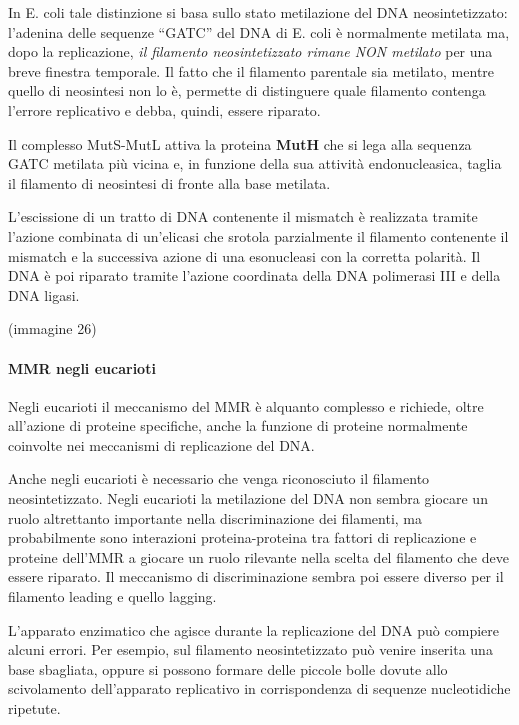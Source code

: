 \documentclass[11pt]{book}
\begin{document}
In E. coli tale distinzione si basa sullo stato metilazione del DNA
neosintetizzato: l'adenina delle sequenze ``GATC'' del DNA di E. coli è
normalmente metilata ma, dopo la replicazione, \emph{il filamento
neosintetizzato rimane NON metilato} per una breve finestra temporale.
Il fatto che il filamento parentale sia metilato, mentre quello di
neosintesi non lo è, permette di distinguere quale filamento contenga
l'errore replicativo e debba, quindi, essere riparato.

Il complesso MutS-MutL attiva la proteina \textbf{MutH} che si lega alla
sequenza GATC metilata più vicina e, in funzione della sua attività
endonucleasica, taglia il filamento di neosintesi di fronte alla base
metilata.

L'escissione di un tratto di DNA contenente il mismatch è realizzata
tramite l'azione combinata di un'elicasi che srotola parzialmente il
filamento contenente il mismatch e la successiva azione di una
esonucleasi con la corretta polarità. Il DNA è poi riparato tramite
l'azione coordinata della DNA polimerasi III e della DNA ligasi.

(immagine 26)

\paragraph{MMR negli eucarioti}\label{mmr-negli-eucarioti}

Negli eucarioti il meccanismo del MMR è alquanto complesso e richiede,
oltre all'azione di proteine specifiche, anche la funzione di proteine
normalmente coinvolte nei meccanismi di replicazione del DNA.

Anche negli eucarioti è necessario che venga riconosciuto il filamento
neosintetizzato. Negli eucarioti la metilazione del DNA non sembra
giocare un ruolo altrettanto importante nella discriminazione dei
filamenti, ma probabilmente sono interazioni proteina-proteina tra
fattori di replicazione e proteine dell'MMR a giocare un ruolo rilevante
nella scelta del filamento che deve essere riparato. Il meccanismo di
discriminazione sembra poi essere diverso per il filamento leading e
quello lagging.

L'apparato enzimatico che agisce durante la replicazione del DNA può
compiere alcuni errori. Per esempio, sul filamento neosintetizzato può
venire inserita una base sbagliata, oppure si possono formare delle
piccole bolle dovute allo scivolamento dell'apparato replicativo in
corrispondenza di sequenze nucleotidiche ripetute.
\end{document}
